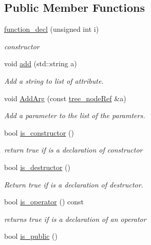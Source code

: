 \subsection*{Public Member Functions}
\begin{DoxyCompactItemize}
\item 
\hyperlink{structfunction__decl_a54c07694f58da2c3f9197aeb068d7c81}{function\+\_\+decl} (unsigned int i)
\begin{DoxyCompactList}\small\item\em constructor \end{DoxyCompactList}\item 
void \hyperlink{structfunction__decl_a3cf702655bb68e0aabd56616c1f17fc2}{add} (std\+::string a)
\begin{DoxyCompactList}\small\item\em Add a string to list of attribute. \end{DoxyCompactList}\item 
void \hyperlink{structfunction__decl_acb241704cea13f7ecd39c8c1fd67e8e4}{Add\+Arg} (const \hyperlink{tree__node_8hpp_a6ee377554d1c4871ad66a337eaa67fd5}{tree\+\_\+node\+Ref} \&a)
\begin{DoxyCompactList}\small\item\em Add a parameter to the list of the paramters. \end{DoxyCompactList}\item 
bool \hyperlink{structfunction__decl_a69081428217c87b99516ceb4d1d32187}{is\+\_\+constructor} ()
\begin{DoxyCompactList}\small\item\em return true if is a declaration of constructor \end{DoxyCompactList}\item 
bool \hyperlink{structfunction__decl_a605cf5474b9950c3d8359325492c4c96}{is\+\_\+destructor} ()
\begin{DoxyCompactList}\small\item\em Return true if is a declaration of destructor. \end{DoxyCompactList}\item 
bool \hyperlink{structfunction__decl_a17b04dabdeed7443468c578ff0c8812d}{is\+\_\+operator} () const
\begin{DoxyCompactList}\small\item\em returns true if is a declaration of an operator \end{DoxyCompactList}\item 
bool \hyperlink{structfunction__decl_a4358508e57432f8971ff434f1f03354b}{is\+\_\+public} ()

\end{DoxyCompactItemize}
